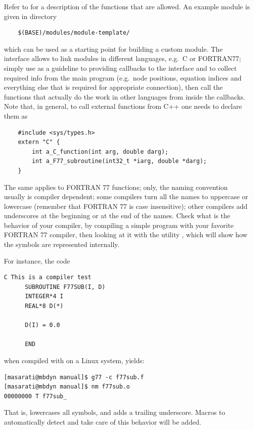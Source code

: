 \noindent
Refer to  for a description of the
functions that are allowed.
An example module is given in directory
\begin{verbatim}
    $(BASE)/modules/module-template/
\end{verbatim}
which can be used as a starting point for building a custom module.
The  interface allows to link modules in different
languages, e.g.\ C or FORTRAN77; simply use 
as a guideline to providing callbacks to the 
interface and to collect required info from the main program
(e.g.\ node positions, equation indices and everything else that is
required for appropriate connection), then call the functions that
actually do the work in other languages from inside the callbacks.
Note that, in general, to call external functions from C++ one needs
to declare them as
\begin{verbatim}
    #include <sys/types.h>
    extern "C" {
        int a_C_function(int arg, double darg);
        int a_F77_subroutine(int32_t *iarg, double *darg);
    }
\end{verbatim}
The same applies to FORTRAN 77 functions; only, the naming convention
usually is compiler dependent; some compilers turn all the names to 
uppercase or lowercase (remember that FORTRAN 77 is case insensitive);
other compilers add underscores at the beginning or at the end of the
names.
Check what is the behavior of your compiler, by compiling a simple 
program with your favorite FORTRAN 77 compiler, then looking at it
with the utility , which will show how the symbols are represented 
internally.

\noindent
For instance, the code
\begin{verbatim}
C This is a compiler test
      SUBROUTINE F77SUB(I, D)
      INTEGER*4 I
      REAL*8 D(*)

      D(I) = 0.0

      END
\end{verbatim}
when compiled with  on a Linux system, yields:
\begin{verbatim}
[masarati@mbdyn manual]$ g77 -c f77sub.f
[masarati@mbdyn manual]$ nm f77sub.o
00000000 T f77sub_
\end{verbatim}
That is,  lowercases all symbols, and adds a trailing 
underscore.
Macros to automatically detect and take care of this behavior 
will be added.


